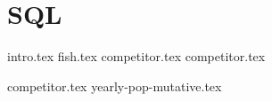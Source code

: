\documentclass{exam}
\begin{document}
\section{SQL}
{intro.tex}
{fish.tex}
\newpage
{competitor.tex}
{competitor.tex}

\begin{questions}
{competitor.tex}
{yearly-pop-mutative.tex}
\end{questions}
\end{document}
